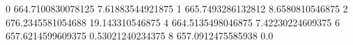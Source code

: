 0 664.7100830078125 7.61883544921875
1 665.7493286132812 8.6580810546875
2 676.2345581054688 19.143310546875
4 664.5135498046875 7.42230224609375
6 657.6214599609375 0.53021240234375
8 657.0912475585938 0.0
